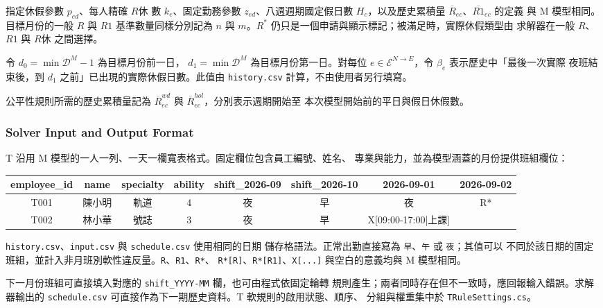 \documentclass[12pt]{article}
\begin{document}
指定休假參數 \(p_{ed}\)、每人精確 \(R休\) 數 \(k_e\)、固定勤務參數 \(z_{ed}\)、八週週期國定假日數
\(H_c\)，以及歷史累積量 \(\overline{R}_{ec}\)、\(\overline{R1}_{ec}\) 的定義
與 M 模型相同。目標月份的一般 \(R\) 與 \(R1\) 基準數量同樣分別記為
\(n\) 與 \(m\)。\(R^*\) 仍只是一個申請與顯示標記；被滿足時，實際休假類型由
求解器在一般 \(R\)、\(R1\) 與 \(R休\) 之間選擇。

令 \(d_0=\min\mathcal{D}^{M}-1\) 為目標月份前一日，
\(d_1=\min\mathcal{D}^{M}\) 為目標月份第一日。對每位
\(e\in\mathcal{E}^{N\rightarrow E}\)，令 \(\beta_e\) 表示歷史中「最後一次實際
夜班結束後，到 \(d_1\) 之前」已出現的實際休假日數。此值由
\texttt{history.csv} 計算，不由使用者另行填寫。

公平性規則所需的歷史累積量記為
\(\overline{R}^{wd}_{ec}\) 與 \(\overline{R}^{hol}_{ec}\)，分別表示週期開始至
本次模型開始前的平日與假日休假數。

\subsubsection{Solver Input and Output Format}

T 沿用 M 模型的一人一列、一天一欄寬表格式。固定欄位包含員工編號、姓名、
專業與能力，並為模型涵蓋的月份提供班組欄位：

\begin{center}
  \footnotesize
  \begin{tabular}{|c|c|c|c|c|c|c|c|}
    \hline
    employee\_id & name & specialty & ability & shift\_2026-09 & shift\_2026-10 & 2026-09-01 & 2026-09-02 \\
    \hline
    T001 & 陳小明 & 軌道 & 4 & 夜 & 早 & 夜 & R* \\
    \hline
    T002 & 林小華 & 號誌 & 3 & 夜 & 早 & X[09:00-17:00|上課] & \\
    \hline
  \end{tabular}
\end{center}

\texttt{history.csv}、\texttt{input.csv} 與 \texttt{schedule.csv} 使用相同的日期
儲存格語法。正常出勤直接寫為 \texttt{早}、\texttt{午} 或 \texttt{夜}；其值可以
不同於該日期的固定班組，並計入非月班別軟性違反量。\texttt{R}、\texttt{R1}、\texttt{R*}、
\texttt{R*[R]}、\texttt{R*[R1]}、\texttt{X[...]} 與空白的意義均與 M 模型相同。

下一月份班組可直接填入對應的 \texttt{shift\_YYYY-MM} 欄，也可由程式依固定輪轉
規則產生；兩者同時存在但不一致時，應回報輸入錯誤。求解器輸出的
\texttt{schedule.csv} 可直接作為下一期歷史資料。T 軟規則的啟用狀態、順序、
分組與權重集中於 \texttt{TRuleSettings.cs}。
\end{document}
